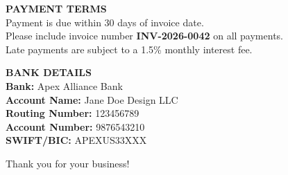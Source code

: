 \documentclass[10pt,letterpaper]{article}
\begin{document}
\begin{minipage}[t]{0.5\textwidth}
    \vspace{0pt}
    {\color{accent}\bfseries\small PAYMENT TERMS} \\[1.5mm]
    {\color{mutedneutral}\small
    Payment is due within 30 days of invoice date. \\
    Please include invoice number \textbf{INV-2026-0042} on all payments. \\
    Late payments are subject to a 1.5\% monthly interest fee.
    }
\end{minipage}%
\begin{minipage}[t]{0.5\textwidth}
    \vspace{0pt}
    \raggedleft
    {\color{accent}\bfseries\small BANK DETAILS} \\[1.5mm]
    {\color{mutedneutral}\small
    \textbf{Bank:} Apex Alliance Bank \\
    \textbf{Account Name:} Jane Doe Design LLC \\
    \textbf{Routing Number:} 123456789 \\
    \textbf{Account Number:} 9876543210 \\
    \textbf{SWIFT/BIC:} APEXUS33XXX
    }
\end{minipage}

\vspace{5mm}
\begin{center}
    {\color{mutedneutral}\small Thank you for your business!}
\end{center}
\end{document}
